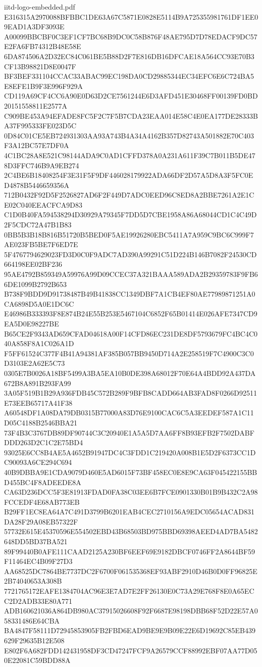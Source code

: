\begin{filecontents*}[overwrite]{iitd-logo-embedded.pdf}
E316315A2970088BFBBC1DE63A67C5871E0828E5114B9A725355981761DF1EE09EAD1A3DF3093E
A00099BBCBF0C3EF1CF7BC68B9DC0C58B876F48AE795D7D78EDACF9DC57E2FA6FB74312B48E58E
6DA874506A2D32EC84C061BE5B88D2F7E816DB16DFCAE18A564CC93E70B3CF13B98821D8E0047F
BF3BEF331104CCAC33ABAC99EC198DA0CD29885344EC34EFC6E6C724BA5E8EFE1B9F3E996F929A
CD119A69CF4CC6A90E0D63D2CE7561244E6D3AFD451E30468FF00139FD0BD20151558811E2577A
C909BE453A94EFADE8FC5F2C7F5B7CDA23EAA014E58C4E0EA177DE28333BA37F995333FE023D5C
0D84C01CE5EB724931303AA93A743B4A34A4162B357D82743A501882E70C403F3A12BC57E7DF0A
4C1BC28A8E521C98144ADA9C0AD1CFFD378A0A231A611F39C7B011B5DE478D3FFC746B9A9EB274
2C4BE6B18408254F3E31F5F9DF446028179922ADA66DF2D57A5D8A3F5FC0ED4878B5446659356A
712B0432F92D5F2526827AD6F2F449D7ADC0EED96C8ED8A2BBE7261A2E1CE02C040EEACFCA9D83
C1D0B40FA594538294D30929A79345F7DD5D7CBE1958A86A68044CD1C4C49D2F5CDC72A47B1B83
0BB5B3B18B816B51720B5BED0F5AE19926280EBC5411A7A959C9BC6C999F7AE023FB5BE7F6ED7E
5F4767794629023FD3D0C0F9ADC7AD390A99291C51D224B146B7082F24530CD664198EE02BF236
95AE4792B859349A59976A99D09CCEC37A321BAAA589ADA2B29359783F9FB66DE1099B2792B653
B738F9BDD9D91738487B49B41838CC1349DBF7A1CB4EF80AE77989871251A0CA6898D5A0E1DC6C
E46986B333393F8E874B24E55B253E5467104C6852F65B01414E026AFE7347CD9EA5D0E98227BE
B65CE2F9343AD659CFAD04618A00F14CFD86EC231DE8DF5793679FC4BC4C040A858F8A1C026A1D
F5FF61524C377F4B41A94381AF385B057BB9450D714A2E258519F7C4900C3C0D3103E2A62E5C73
0305E7B0026A18BF5499A3BA5EA10B0DE398A68012F70E64A4BDD92A437DA672B8A891B293FA99
3A05F519B1B29A936FDB45C572B289F9BFB8CADD664AB3FAD8F0266D92511E73EEB65717A41F38
A60548DF1A08DA79DB0315B77000A83D76E9100CAC6C5A3EEDEF587A1C11D05C4188B2546BBA21
73F4B3C3767DB89DF90744C3C20940E1A5A5D7AA6FF8B93EFB2F7502DABFDDD263D2C1C2E75BD4
93025E6CC8B4AE5A4652B91947DC4C3FDD1C219420A008B1E5D2F6373CC1DC90093A6CE294C694
40B9DBBA9E1CDA9079D460E5AD6015F73BF458EC0E8E9CA63F045422155BBD455BC4F8ADEEDE8A
CA63D236DCC5F3E81913FDAD0FA38C03EE6B7FCE0901330B01B9B432C2A98FCCEDF4E68AB773EB
B29FF1EC8EA64A7C491D3799B6201EAB4CEC2710156A9EDC05654ACAD831DA28F29A08EB57322F
57732E615E45370596E554502EBD43B68503BD975BBD69398AEED4AD7BA5482648DD5BD37BA521
89F99440B0AFE111CAAD2125A230BF6EEF69E9182DBCF0746FF2A8644BF59F11464EC4B09F27D3
AA68525DC7864BE7737DC2F6700F061535368EF93ABF2910D46B0D0FF96825E2B74040653A308B
7721765172EAFE1384704AC96E3E7AD7E2FF26130E0C73A29E768F8E0A65ECC2D2ADB33E80A771
ADB160621036A864DB980AC37915026608F92F6687E98198DBB68F52D22E57A058331486E64CBA
BA4847F58111D72945853905FB2FBD6EAD9BE9E9B09E22E6D19692C85EB439629F29635B12E508
E802F6A682FDD142431958DF3CD47247FCF9A26579CCF88992EBF07AA77D050E22081C59BDD88A

\end{filecontents*}
